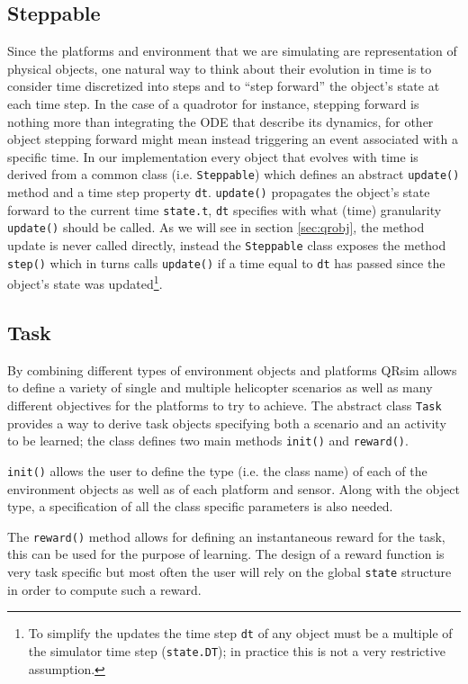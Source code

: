 \documentclass[a4paper,11pt]{report}
\newcommand{\sname}{QRsim\xspace}
\begin{document}
\subsection{Steppable}

Since the platforms and environment that we are simulating are representation of physical objects, one natural way to think about their evolution in time is to consider time discretized into steps and to ``step forward'' the object's state at each time step. In the case of a quadrotor for instance, stepping forward is nothing more than integrating the ODE that describe its dynamics, for other object stepping forward might mean instead triggering an event associated with a specific time.
In our implementation every object that evolves with time is derived from a common class (i.e. \texttt{Steppable}) which defines an abstract \texttt{update()} method and a time step property \texttt{dt}. \texttt{update()} propagates the object's state forward to the current time \texttt{state.t}, \texttt{dt} specifies with what (time) granularity \texttt{update()} should be called. As we will see in section \ref{sec:qrobj}, the method update is never called directly, instead the  \texttt{Steppable} class exposes the method \texttt{step()} which in turns calls \texttt{update()} if a time equal to \texttt{dt} has passed since the object's state was updated\footnote{To simplify the updates the time step \texttt{dt} of any object must be a multiple of the simulator time step (\texttt{state.DT}); in practice this is not a very restrictive assumption.}.

\subsection{Task}

By combining different types of environment objects and platforms \sname allows to define a variety of single and multiple helicopter scenarios as well as many different objectives for the platforms to try to achieve. 
The abstract class \texttt{Task} provides a way to derive task objects specifying both a scenario and an activity to be learned; the class defines two main methods \texttt{init()} and \texttt{reward()}.

\texttt{init()} allows the user to define the type (i.e. the class name) of each of the environment objects as well as of each platform and sensor. 
Along with the object type, a specification of all the class specific parameters is also needed.

The \texttt{reward()} method allows for defining an instantaneous reward for the task, this can be used for the purpose of learning. The design of a reward function is very task specific but most often the user will rely on the global \texttt{state} structure in order to compute such a reward.
\end{document}
